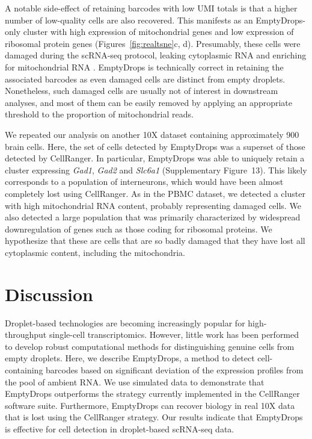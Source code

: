 \documentclass[10pt,letterpaper]{article}
\newcommand{\suppfigneuron}{13}
\begin{document}
A notable side-effect of retaining barcodes with low UMI totals is that a higher number of low-quality cells are also recovered.
This manifests as an EmptyDrops-only cluster with high expression of mitochondrial genes and low expression of ribosomal protein genes (Figures~\ref{fig:realtsne}c, d).
Presumably, these cells were damaged during the scRNA-seq protocol, leaking cytoplasmic RNA and enriching for mitochondrial RNA \cite{ilicic2016classification}.
EmptyDrops is technically correct in retaining the associated barcodes as even damaged cells are distinct from empty droplets.
Nonetheless, such damaged cells are usually not of interest in downstream analyses, 
and most of them can be easily removed by applying an appropriate threshold to the proportion of mitochondrial reads.

We repeated our analysis on another 10X dataset containing approximately 900 brain cells.
Here, the set of cells detected by EmptyDrops was a superset of those detected by CellRanger.
In particular, EmptyDrops was able to uniquely retain a cluster expressing \textit{Gad1}, \textit{Gad2} and \textit{Slc6a1} (Supplementary Figure~\suppfigneuron{}).
This likely corresponds to a population of interneurons, which would have been almost completely lost using CellRanger.
As in the PBMC dataset, we detected a cluster with high mitochondrial RNA content, probably representing damaged cells.
We also detected a large population that was primarily characterized by widespread downregulation of genes such as those coding for ribosomal proteins.
We hypothesize that these are cells that are so badly damaged that they have lost all cytoplasmic content, including the mitochondria.

\section*{Discussion}
Droplet-based technologies are becoming increasingly popular for high-throughput single-cell transcriptomics.
However, little work has been performed to develop robust computational methods for distinguishing genuine cells from empty droplets.
Here, we describe EmptyDrops, a method to detect cell-containing barcodes based on significant deviation of the expression profiles from the pool of ambient RNA.
We use simulated data to demonstrate that EmptyDrops outperforms the strategy currently implemented in the CellRanger software suite.
Furthermore, EmptyDrops can recover biology in real 10X data that is lost using the CellRanger strategy.
Our results indicate that EmptyDrops is effective for cell detection in droplet-based scRNA-seq data.
\end{document}
